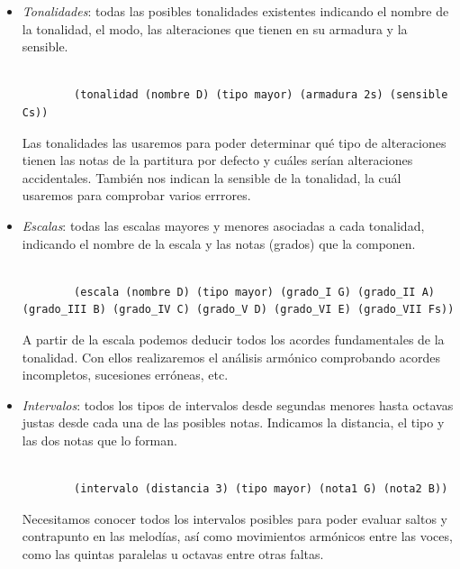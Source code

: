 \begin{itemize}

	\item \textit{Tonalidades}: todas las posibles tonalidades existentes indicando el nombre de la tonalidad, el modo, las alteraciones que tienen en su armadura y la sensible.

	\begin{lstlisting}

		(tonalidad (nombre D) (tipo mayor) (armadura 2s) (sensible Cs))

	\end{lstlisting}

	Las tonalidades las usaremos para poder determinar qué tipo de alteraciones tienen las notas de la partitura por defecto y cuáles serían alteraciones accidentales. También nos indican la sensible de la tonalidad, la cuál usaremos para comprobar varios errrores.

	\bigskip

	\item \textit{Escalas}: todas las escalas mayores y menores asociadas a cada tonalidad, indicando el nombre de la escala y las notas (grados) que la componen. 

	\begin{lstlisting}

		(escala (nombre D) (tipo mayor) (grado_I G) (grado_II A) (grado_III B) (grado_IV C) (grado_V D) (grado_VI E) (grado_VII Fs))

	\end{lstlisting}

	A partir de la escala podemos deducir todos los acordes fundamentales de la tonalidad. Con ellos realizaremos el análisis armónico comprobando acordes incompletos, sucesiones erróneas, etc.

	\bigskip

	\item \textit{Intervalos}: todos los tipos de intervalos desde segundas menores hasta octavas justas desde cada una de las posibles notas. Indicamos la distancia, el tipo y las dos notas que lo forman.

	\begin{lstlisting}

		(intervalo (distancia 3) (tipo mayor) (nota1 G) (nota2 B))

	\end{lstlisting}

	Necesitamos conocer todos los intervalos posibles para poder evaluar saltos y contrapunto en las melodías, así como movimientos armónicos entre las voces, como las quintas paralelas u octavas entre otras faltas.


\end{itemize}
